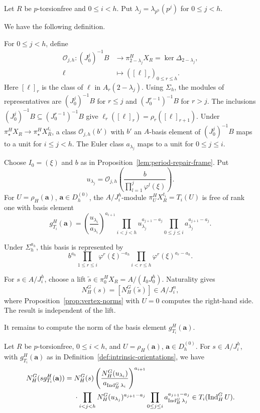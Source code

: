 Let $R$ be $p$-torsionfree and $0\le i<h$.
Put $\lambda_j=\lambda_{p^h}(p^j)$ for $0\le j<h$.

We have the following definition.

\begin{definition}\label{def:intrinsic-orientations}
For $0\le j<h$, define
\[
\begin{aligned}
\mathcal O_{j,h}:(J_0^j)^{-1}B&\longrightarrow
\pi_{2-\lambda_j}^H X_R=\ker\Delta_{2-\lambda_j},\\
\ell&\longmapsto([\ell]_r)_{0\le r\le h}.
\end{aligned}
\]
Here $[\ell]_r$ is the class of $\ell$ in $A_r(2-\lambda_j)$.
Using $\Sigma_h$, the modules of representatives are
$(J_0^j)^{-1}B$ for $r\le j$ and $(J_0^{r-1})^{-1}B$ for $r>j$.
The inclusions $(J_0^j)^{-1}B\subseteq (J_0^{r-1})^{-1}B$ give
$\ell_r([\ell]_r)=\rho_r([\ell]_{r+1})$.
Under $\pi_\star^H X_R\to\pi_\star^H X_R^{t_i}$, a class
$\mathcal O_{j,h}(b')$ with $b'$ an $A$-basis element of $(J_0^j)^{-1}B$
maps to a unit for $i\le j<h$. The Euler class $a_{\lambda_j}$ maps to
a unit for $0\le j\le i$.

Choose $I_0=(\xi)$ and $b$ as in
Proposition~\ref{lem:period-repair-frame}. Put
\[
u_{\lambda_j}=\mathcal O_{j,h}\left(
\frac{b}{\prod_{l=1}^j\varphi^l(\xi)}\right).
\]
For $U=\rho_H(\mathbf a)$, $\mathbf a\in D_h^{(0)}$, the $A/J_i^h$-module
$\pi_U^H X_R^{t_i}=T_i(U)$ is free of rank one with basis element
\begin{equation}\label{eq:tate-unit-generator}
g_{T_i}^H(\mathbf a)=
\left(\frac{u_{\lambda_i}}{a_{\lambda_i}}\right)^{a_{i+1}}
\prod_{i<j<h}u_{\lambda_j}^{a_{j+1}-a_j}\prod_{0\le j\le i}a_{\lambda_j}^{a_{j+1}-a_j}.
\end{equation}
\end{definition}

Under $\Sigma_h^{a_h}$, this basis is represented by
\[
b^{a_h}\prod_{1\le r\le i}\varphi^r(\xi)^{-a_h}
\prod_{i<r\le h}\varphi^r(\xi)^{a_r-a_h}.
\]

For $s\in A/J_i^h$, choose a lift
$\widetilde s\in\pi_0^H X_R=A/(I_0J_0^h)$. Naturality gives
\[
N_H^G(s)=[N_H^G(\widetilde s)]\in A/J_i^n,
\]
where Proposition~\ref{prop:vertex-norms} with $U=0$ computes the
right-hand side. The result is independent of the lift.

It remains to compute the norm of the basis element $g_{T_i}^H(\mathbf a)$.

\begin{proposition}\label{lem:period-repair-norm}
Let $R$ be $p$-torsionfree, $0\le i<h$, and
$U=\rho_H(\mathbf a)$, $\mathbf a\in D_h^{(0)}$.
For $s\in A/J_i^h$, with $g_{T_i}^H(\mathbf a)$ as in
Definition~\ref{def:intrinsic-orientations}, we have
\[
\begin{aligned}
N_H^G(sg_{T_i}^H(\mathbf a))
={}&N_H^G(s)
\left(\frac{N_H^G(u_{\lambda_i})}
{a_{\operatorname{Ind}_H^G\lambda_i}}\right)^{a_{i+1}}\\
&\cdot\prod_{i<j<h}
N_H^G(u_{\lambda_j})^{a_{j+1}-a_j}
\prod_{0\le j\le i}
a_{\operatorname{Ind}_H^G\lambda_j}^{a_{j+1}-a_j}
\in T_i(\operatorname{Ind}_H^G U).
\end{aligned}
\]
\end{proposition}

